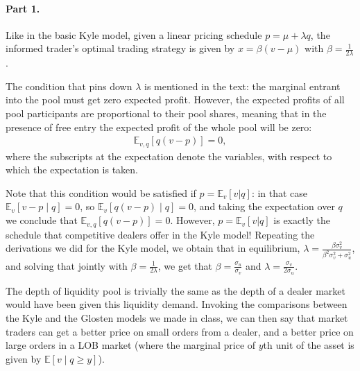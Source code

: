 \begin{solution}
	\paragraph{Part 1.}
	Like in the basic Kyle model, given a linear pricing schedule $p = \mu + \lambda q$, the informed trader's optimal trading strategy is given by $x = \beta (v-\mu)$ with $\beta = \frac{1}{2\lambda}$.
	
	The condition that pins down $\lambda$ is mentioned in the text: the marginal entrant into the pool must get zero expected profit. However, the expected profits of all pool participants are proportional to their pool shares, meaning that in the presence of free entry the expected profit of the whole pool will be zero:
	\begin{align*}
		\mathbb{E}_{v,q} \left[ q (v - p) \right] = 0,
	\end{align*}
	where the subscripts at the expectation denote the variables, with respect to which the expectation is taken.
	
	Note that this condition would be satisfied if $p = \mathbb{E}_v[v|q]$: in that case $\mathbb{E}_v[v-p \mid q]=0$, so $\mathbb{E}_v[q(v-p) \mid q] = 0$, and taking the expectation over $q$ we conclude that $\mathbb{E}_{v,q} \left[ q (v - p) \right] = 0$.
	However, $p = \mathbb{E}_v[v|q]$ is exactly the schedule that competitive dealers offer in the Kyle model! Repeating the derivations we did for the Kyle model, we obtain that in equilibrium, $\lambda = \frac{\beta \sigma^2_v}{\beta^2 \sigma^2_v + \sigma^2_u}$, and solving that jointly with $\beta = \frac{1}{2\lambda}$, we get that $\beta = \frac{\sigma_u}{\sigma_v}$ and $\lambda = \frac{\sigma_v}{2\sigma_u}$.
	
	The depth of liquidity pool is trivially the same as the depth of a dealer market would have been given this liquidity demand. Invoking the comparisons between the Kyle and the Glosten models we made in class, we can then say that market traders can get a better price on small orders from a dealer, and a better price on large orders in a LOB market (where the marginal price of $y$th unit of the asset is given by $\mathbb{E}[v \mid q \geq y]$).
	

\end{solution}
